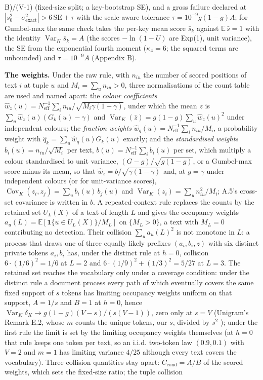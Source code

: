 \documentclass[11pt,letterpaper]{article}
\begin{document}
B)/(V-1)\) (fixed-size split; a key-bootstrap SE), and a gross failure declared at \(|s_0^2 - \sigma^2_{\mathrm{exact}}| > 6\,\mathrm{SE} + \tau\) with the scale-aware tolerance \(\tau = 10^{-9} g(1-g) A\); for Gumbel-max the same check takes the per-key mean score \(\bar s_k\) against \(\mathbb{E}\,\bar s = 1\) with the identity \(\operatorname{Var}_K \bar s_k = A\) (the scores \(-\ln(1-U)\) are Exp(1), unit variance), the SE from the exponential fourth moment (\(\kappa_4 = 6\); the squared terms are unbounded) and \(\tau = 10^{-9} A\) (Appendix B).

\textbf{The weights.} Under the raw rule, with \(n_{iu}\) the number of scored positions of text \(i\) at tuple \(u\) and \(M_i = \sum_u n_{iu} > 0\), three normalisations of the count table are used and named apart: the \emph{colour coefficients} \(\hat w_z(u) = N_{\mathrm{eff}}^{-1}\sum_i n_{iu}/\sqrt{M_i\gamma(1-\gamma)}\), under which the mean \(z\) is \(\sum_u \hat w_z(u)(G_k(u) - \gamma)\) and \(\operatorname{Var}_K(\bar z) = g(1-g)\sum_u \hat w_z(u)^2\) under independent colours; the \emph{fraction weights} \(\hat w_q(u) = N_{\mathrm{eff}}^{-1}\sum_i n_{iu}/M_i\), a probability weight with \(\hat q_k = \sum_u \hat w_q(u) G_k(u)\) exactly; and the \emph{standardised weights} \(b_i(u) = n_{iu}/\sqrt{M_i}\) per text, \(b(u) = N_{\mathrm{eff}}^{-1}\sum_i b_i(u)\) per set, which multiply a colour standardised to unit variance, \((G - g)/\sqrt{g(1-g)}\), or a Gumbel-max score minus its mean, so that \(\hat w_z = b/\sqrt{\gamma(1-\gamma)}\) and, at \(g = \gamma\) under independent colours (or for unit-variance scores), \(\operatorname{Cov}_K(z_i, z_j) = \sum_u b_i(u)\,b_j(u)\) and \(\operatorname{Var}_K(z_i) = \sum_u n_{iu}^2/M_i\); A.5's cross-set covariance is written in \(b\). A repeated-context rule replaces the counts by the retained set \(U_L(X)\) of a text of length \(L\) and gives the occupancy weights \(a_u(L) = \mathbb{E}[\mathbf 1\{u \in U_L(X)\}/M_L]\) on \(\{M_L > 0\}\), a text with \(M_L = 0\) contributing no detection. Their collision \(\sum_u a_u(L)^2\) is not monotone in \(L\): a process that draws one of three equally likely prefixes \((a_i, b_i, z)\) with six distinct private tokens \(a_i, b_i\) has, under the distinct rule at \(h = 0\), collision \(6\cdot(1/6)^2 = 1/6\) at \(L = 2\) and \(6\cdot(1/9)^2 + (1/3)^2 = 5/27\) at \(L = 3\). The retained set reaches the vocabulary only under a coverage condition: under the distinct rule a document process every path of which eventually covers the same fixed support of \(s\) tokens has limiting occupancy weights uniform on that support, \(A = 1/s\) and \(B = 1\) at \(h = 0\), hence \(\operatorname{Var}_K \delta_K \to g(1-g)(V-s)/(s(V-1))\), zero only at \(s = V\) (Unigram's Remark E.2, whose \(m\) counts the unique tokens, our \(s\), divided by \(s^2\) \citep[p.~34]{zhao2024unigram}); under the first rule the limit is set by the limiting occupancy weights themselves (at \(h = 0\) that rule keeps one token per text, so an i.i.d. two-token law \((0.9, 0.1)\) with \(V = 2\) and \(m = 1\) has limiting variance \(4/25\) although every text covers the vocabulary). Three collision quantities stay apart: \(C_{\mathrm{cond}} = A/B\) of the scored weights, which sets the fixed-size ratio; the tuple collision 
\end{document}
